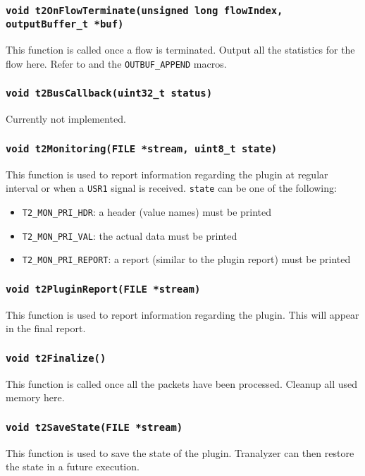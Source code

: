 \documentclass[documentation]{subfiles}
\begin{document}
\subsubsection{\tt void t2OnFlowTerminate(unsigned long flowIndex, outputBuffer\_t *buf)}\label{t2cb-t2OnFlowTerminate}
This function is called once a flow is terminated.
Output all the statistics for the flow here.
Refer to  and the {\tt OUTBUF\_APPEND} macros.

\subsubsection{\tt void t2BusCallback(uint32\_t status)}\label{t2cb-t2BusCallback}
Currently not implemented.

\subsubsection{\tt void t2Monitoring(FILE *stream, uint8\_t state)}\label{t2cb-t2Monitoring}
This function is used to report information regarding the plugin at regular interval or when a {\tt USR1} signal is received.
{\tt state} can be one of the following:
\begin{itemize}
    \item {\tt T2\_MON\_PRI\_HDR}: a header (value names) must be printed
    \item {\tt T2\_MON\_PRI\_VAL}: the actual data must be printed
    \item {\tt T2\_MON\_PRI\_REPORT}: a report (similar to the plugin report) must be printed
\end{itemize}

\subsubsection{\tt void t2PluginReport(FILE *stream)}\label{t2cb-t2PluginReport}
This function is used to report information regarding the plugin.
This will appear in the final report.

\subsubsection{\tt void t2Finalize()}\label{t2cb-t2Finalize}
This function is called once all the packets have been processed.
Cleanup all used memory here.

\subsubsection{\tt void t2SaveState(FILE *stream)}\label{t2cb-t2SaveState}
This function is used to save the state of the plugin.
Tranalyzer can then restore the state in a future execution.
\end{document}
